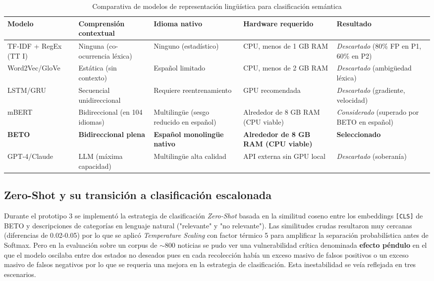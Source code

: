 \vspace{0.5cm}
\begin{table}[htbp]
\centering
\caption{Comparativa de modelos de representación lingüística para clasificación semántica}
\label{tab:comparativa_modelos_nlp}
\begin{tabular}{|p{2.2cm}|p{3.0cm}|p{2.4cm}|p{2.4cm}|p{1.8cm}|}
\hline
\textbf{Modelo} &
\textbf{Comprensión contextual} &
\textbf{Idioma nativo} &
\textbf{Hardware requerido} &
\textbf{Resultado} \\
\hline
TF-IDF + RegEx (TT I) &
Ninguna (co-ocurrencia léxica) &
Ninguno (estadístico) &
CPU, menos de 1 GB RAM &
\textit{Descartado} (80\% FP en P1, 60\% en P2) \\
\hline
Word2Vec/GloVe &
Estática (sin contexto) &
Español limitado &
CPU, menos de 2 GB RAM &
\textit{Descartado} (ambigüedad léxica) \\
\hline
LSTM/GRU &
Secuencial unidireccional &
Requiere reentrenamiento &
GPU recomendada &
\textit{Descartado} (gradiente, velocidad) \\
\hline
mBERT &
Bidireccional (en 104 idiomas) &
Multilingüe (sesgo reducido en español) &
Alrededor de 8 GB RAM (CPU viable) &
\textit{Considerado} (superado por BETO en español) \\
\hline
\textbf{BETO} &
\textbf{Bidireccional plena} &
\textbf{Español monolingüe nativo} &
\textbf{Alrededor de 8 GB RAM (CPU viable)} &
\textbf{Seleccionado} \\
\hline
GPT-4/Claude &
LLM (máxima capacidad) &
Multilingüe alta calidad &
API externa sin GPU local &
\textit{Descartado} (soberanía) \\
\hline
\end{tabular}
\end{table}
\vspace{0.4cm}

\subsection{Zero-Shot y su transición a clasificación escalonada}
\label{subsec:ea_zeroshot_vs_finetune}

Durante el prototipo 3 se implementó la estrategia de clasificación \textit{Zero-Shot} basada en la
similitud coseno entre los embeddings \texttt{[CLS]} de BETO y descripciones de categorías en lenguaje
natural ("relevante" y "no relevante"). Las similitudes crudas resultaron muy cercanas
(diferencias de 0.02-0.05) por lo que se aplicó \textit{Temperature Scaling} con factor térmico 5
para amplificar la separación probabilística antes de Softmax. Pero en la evaluación sobre un
corpus de $\sim$800 noticias se pudo ver una vulnerabilidad crítica denominada \textbf{efecto
péndulo} en el que el modelo oscilaba entre dos estados no deseados pues en cada recolección
había un exceso masivo de falsos positivos o un exceso masivo de falsos negativos por lo que se
requeria una mejora en la estrategia de clasificación. Esta inestabilidad se veía reflejada en tres
escenarios.

